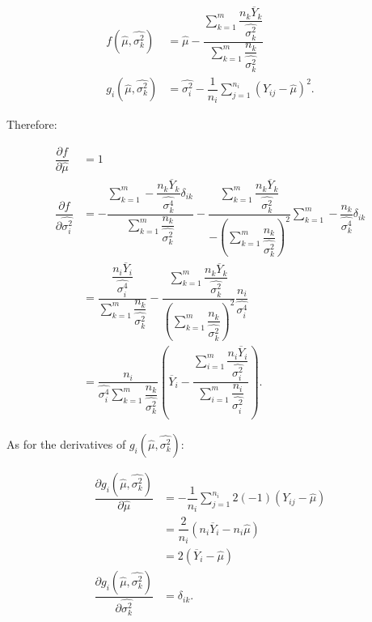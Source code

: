 \documentclass[12pt,a4paper,openright]{article}
\newcommand{\ovY}{\overline{Y}}
\newcommand{\wmu}{\widehat{\mu}}
\begin{document}
	\begin{align*}
		f(\wmu, \widehat{\sigma^2_k}) &= \wmu - \dfrac{\sum_{k=1}^m \dfrac{n_k \ovY_k}{\widehat{\sigma^2_k}}}{\sum_{k=1}^m \dfrac{n_k}{\widehat{\sigma^2_k}}} \\
		g_i(\wmu, \widehat{\sigma^2_k}) &= \widehat{\sigma^2_i} - \dfrac{1}{n_i} \sum_{j=1}^{n_i} (Y_{ij}-\wmu)^2.
	\end{align*}

	Therefore:
	
	\begin{align*}
		\dfrac{\partial f}{\partial \wmu} &= 1\\
		\dfrac{\partial f}{\partial \widehat{\sigma^2_i}} &= -\dfrac{\sum_{k=1}^m -\dfrac{n_k \ovY_k}{\widehat{\sigma^4_k}}\delta_{ik}}{\sum_{k=1}^m \dfrac{n_k}{\widehat{\sigma^2_k}}} - \dfrac{\sum_{k=1}^m \dfrac{n_k \ovY_k}{\widehat{\sigma^2_k}}}{-\left(\sum_{k=1}^m \dfrac{n_k}{\widehat{\sigma^2_k}}\right)^2} \sum_{k=1}^m -\dfrac{n_k}{\widehat{\sigma^4_k}}\delta_{ik} \\
		&= \dfrac{\dfrac{n_i \ovY_i}{\widehat{\sigma^4_i}}}{\sum_{k=1}^m \dfrac{n_k}{\widehat{\sigma^2_k}}} - \dfrac{\sum_{k=1}^m \dfrac{n_k \ovY_k}{\widehat{\sigma^2_k}}}{\left(\sum_{k=1}^m \dfrac{n_k}{\widehat{\sigma^2_k}}\right)^2} \dfrac{n_i}{\widehat{\sigma^4_i}} \\
		&= \dfrac{n_i}{\widehat{\sigma^4_i}\sum_{k=1}^m \dfrac{n_k}{\widehat{\sigma^2_k}}} \left(\ovY_i - \dfrac{\sum_{i=1}^m \dfrac{n_i \ovY_i}{\widehat{\sigma^2_i}}}{\sum_{i=1}^m \dfrac{n_i}{\widehat{\sigma^2_i}}}\right).
	\end{align*}

	As for the derivatives of $g_i(\wmu, \widehat{\sigma^2_k})$:
	
	\begin{align*}
		\dfrac{\partial g_i(\wmu, \widehat{\sigma^2_k})}{\partial \wmu} &= -\dfrac{1}{n_i} \sum_{j=1}^{n_i} 2(-1)(Y_{ij}-\wmu) \\
		&= \dfrac{2}{n_i} (n_i\ovY_i - n_i\wmu) \\
		&= 2(\ovY_i-\wmu) \\
		\dfrac{\partial g_i(\wmu, \widehat{\sigma^2_k})}{\partial \widehat{\sigma^2_k}} &= \delta_{ik}.
	\end{align*}
\end{document}
